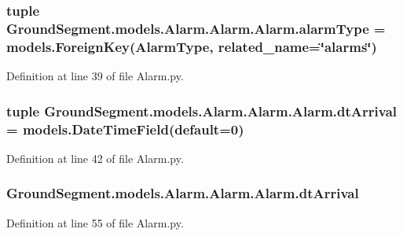 \subsubsection[{alarm\+Type}]{\setlength{\rightskip}{0pt plus 5cm}tuple Ground\+Segment.\+models.\+Alarm.\+Alarm.\+Alarm.\+alarm\+Type = models.\+Foreign\+Key({\bf Alarm\+Type}, related\+\_\+name=\char`\"{}alarms\char`\"{})\hspace{0.3cm}{\ttfamily [static]}}\label{class_ground_segment_1_1models_1_1_alarm_1_1_alarm_1_1_alarm_af5f6eb07782af5a907880d9120c1bca4}


Definition at line 39 of file Alarm.\+py.

\hypertarget{class_ground_segment_1_1models_1_1_alarm_1_1_alarm_1_1_alarm_a020cb3f0f8923b094ba710029d0dd433}{}
\subsubsection[{dt\+Arrival}]{\setlength{\rightskip}{0pt plus 5cm}tuple Ground\+Segment.\+models.\+Alarm.\+Alarm.\+Alarm.\+dt\+Arrival = models.\+Date\+Time\+Field(default=0)\hspace{0.3cm}{\ttfamily [static]}}\label{class_ground_segment_1_1models_1_1_alarm_1_1_alarm_1_1_alarm_a020cb3f0f8923b094ba710029d0dd433}


Definition at line 42 of file Alarm.\+py.

\hypertarget{class_ground_segment_1_1models_1_1_alarm_1_1_alarm_1_1_alarm_aa22cb77ce71da33580d369eed7306091}{}
\subsubsection[{dt\+Arrival}]{\setlength{\rightskip}{0pt plus 5cm}Ground\+Segment.\+models.\+Alarm.\+Alarm.\+Alarm.\+dt\+Arrival}\label{class_ground_segment_1_1models_1_1_alarm_1_1_alarm_1_1_alarm_aa22cb77ce71da33580d369eed7306091}


Definition at line 55 of file Alarm.\+py.

